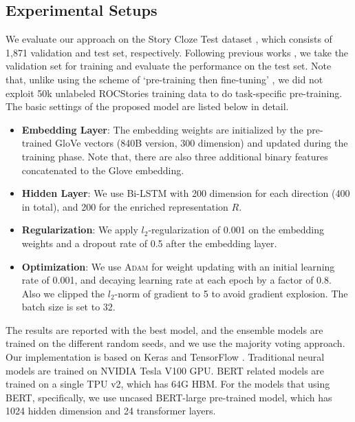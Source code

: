 \documentclass[letterpaper]{article} %
\begin{document}
\subsection{Experimental Setups}
We evaluate our approach on the Story Cloze Test dataset \cite{mostafazadeh-etal-2016}, which consists of 1,871 validation and test set, respectively.
Following previous works \cite{cai-etal-2017,chaturvedi-etal-2017,schwartz-etal-2017}, we take the validation set for training and evaluate the performance on the test set. 
Note that, unlike using the scheme of `pre-training then fine-tuning' \cite{liu-etal-2017}, we did not exploit 50k unlabeled ROCStories training data to do task-specific pre-training.
The basic settings of the proposed model are listed below in detail.
\begin{itemize}
	\item {\bf Embedding Layer}: The embedding weights are initialized by the pre-trained GloVe vectors (840B version, 300 dimension) \cite{pennington-etal-2014} and updated during the training phase. Note that, there are also three additional binary features concatenated to the Glove embedding.
	\item {\bf Hidden Layer}: We use Bi-LSTM with 200 dimension for each direction (400 in total), and 200 for the enriched representation $R$.
	\item {\bf Regularization}: We apply $l_2$-regularization of 0.001 on the embedding weights and a dropout \cite{srivastava-etal-2014} rate of 0.5 after the embedding layer. 
	\item {\bf Optimization}: We use \textsc{Adam} for weight updating \cite{kingma2014adam} with an initial learning rate of 0.001, and decaying learning rate at each epoch by a factor of 0.8. Also we clipped the $l_2$-norm of gradient to 5 \cite{pascanu-etal-2013} to avoid gradient explosion. The batch size is set to 32.
\end{itemize}

The results are reported with the best model, and the ensemble models are trained on the different random seeds, and we use the majority voting approach.
Our implementation is based on Keras \cite{chollet2015keras} and TensorFlow \cite{abadi2016tensorflow}. 
Traditional neural models are trained on NVIDIA Tesla V100 GPU. BERT related models are trained on a single TPU v2, which has 64G HBM.
For the models that using BERT, specifically, we use uncased BERT-large pre-trained model, which has 1024 hidden dimension and 24 transformer layers.

\end{document}
